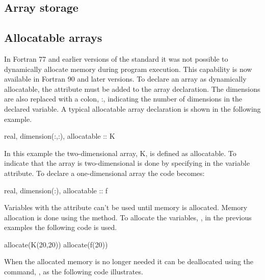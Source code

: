\subsection{Array storage}

\subsection{Allocatable arrays}

In Fortran 77 and earlier versions of the standard it was not possible to dynamically allocate memory during program execution. This capability is now available in Fortran 90 and later versions. To declare an array as dynamically allocatable, the attribute  must be added to the array declaration. The dimensions are also replaced with a colon, :, indicating the number of dimensions in the declared variable. A typical allocatable array declaration is shown in the following example.

\begin{fortrancodeenv}
real, dimension(:,:), allocatable :: K
\end{fortrancodeenv}

In this example the two-dimensional array, K, is defined as allocatable. To indicate that the array is two-dimensional is done by specifying  in the variable attribute. To declare a one-dimensional array the code becomes:

\begin{fortrancodeenv}
real, dimension(:), allocatable :: f
\end{fortrancodeenv}

Variables with the  attribute can't be used until memory is allocated. Memory allocation is done using the  method. To allocate the variables, , in the previous examples the following code is used.

\begin{fortrancodeenv}
allocate(K(20,20))
allocate(f(20))
\end{fortrancodeenv}

When the allocated memory is no longer needed it can be deallocated using the command, , as the following code illustrates.

